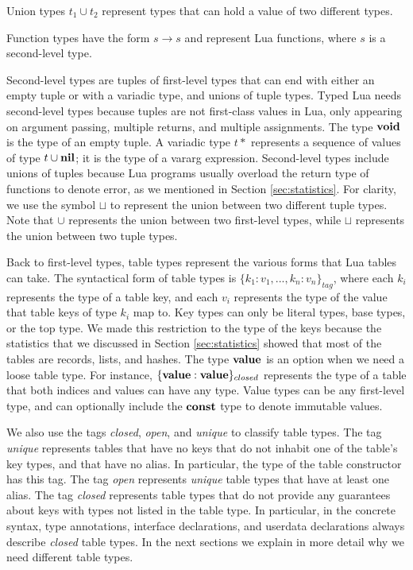 Union types $t_{1} \cup t_{2}$ represent types that can hold a value
of two different types.

Function types have the form $s \rightarrow s$ and represent Lua functions,
where $s$ is a second-level type.

Second-level types are tuples of first-level types that can end
with either an empty tuple or with a variadic type, and
unions of tuple types.
Typed Lua needs second-level types because tuples are not first-class
values in Lua, only appearing on argument passing, multiple returns,
and multiple assignments.
The type $\mathbf{void}$ is the type of an empty tuple.
A variadic type $t*$ represents a sequence of values of type $t \cup \mathbf{nil}$;
it is the type of a vararg expression.
Second-level types include unions of tuples because Lua programs
usually overload the return type of functions to denote error,
as we mentioned in Section \ref{sec:statistics}.
For clarity, we use the symbol $\sqcup$ to represent the union between
two different tuple types.
Note that $\cup$ represents the union between two first-level types,
while $\sqcup$ represents the union between two tuple types.

Back to first-level types, table types represent the various forms
that Lua tables can take.
The syntactical form of table types is $\{ k_{1}{:}v_{1}, ..., k_{n}{:}v_{n} \}_{tag}$,
where each $k_{i}$ represents the type of a table key,
and each $v_{i}$ represents the type of the value that table keys of type $k_{i}$ map to.
Key types can only be literal types, base types, or the top type.
We made this restriction to the type of the keys because the statistics
that we discussed in Section \ref{sec:statistics} showed that most
of the tables are records, lists, and hashes.
The type $\mathbf{value}$ is an option when we need a loose table type.
For instance, $\{\mathbf{value}:\mathbf{value}\}_{closed}$ represents the type of a
table that both indices and values can have any type.
Value types can be any first-level type, and can optionally include
the $\mathbf{const}$ type to denote immutable values.

We also use the tags \emph{closed}, \emph{open}, and \emph{unique}
to classify table types.
The tag \emph{unique} represents tables that have no keys that do not
inhabit one of the table's key types, and that have no alias.
In particular, the type of the table constructor has this tag.
The tag \emph{open} represents \emph{unique} table types that
have at least one alias.
The tag \emph{closed} represents table types that do not provide
any guarantees about keys with types not listed in the table type.
In particular, in the concrete syntax, type annotations, interface
declarations, and userdata declarations always describe \emph{closed} table types.
In the next sections we explain in more detail why we need
different table types.

